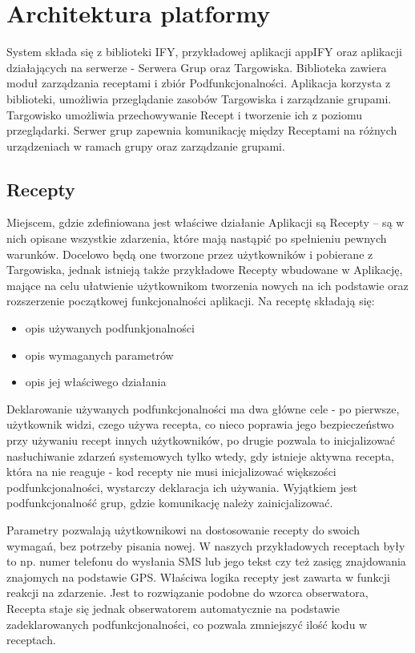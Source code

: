 \documentclass[11pt,a4paper,polish,thesis]{dcsbook}
\begin{document}
\chapter{Architektura platformy}
System składa się z biblioteki IFY, przykładowej aplikacji appIFY oraz aplikacji działających na serwerze - Serwera Grup oraz Targowiska.
Biblioteka zawiera moduł zarządzania receptami i zbiór Podfunkcjonalności.
Aplikacja korzysta z biblioteki, umożliwia przeglądanie zasobów Targowiska i zarządzanie grupami. 
Targowisko umożliwia przechowywanie Recept i tworzenie ich z poziomu przeglądarki.
Serwer grup zapewnia komunikację między Receptami na różnych urządzeniach w ramach grupy oraz zarządzanie grupami.

\section{Recepty}
Miejscem, gdzie zdefiniowana jest właściwe działanie Aplikacji są Recepty -- są w nich opisane wszystkie zdarzenia, które mają nastąpić po spełnieniu pewnych warunków. Docelowo będą one tworzone przez użytkowników i pobierane z Targowiska, jednak istnieją także przykładowe Recepty wbudowane w Aplikację, mające na celu ułatwienie użytkownikom tworzenia nowych na ich podstawie oraz rozszerzenie początkowej funkcjonalności aplikacji. 
Na receptę składają się:
\begin{itemize}
\item  opis używanych podfunkjonalności
\item  opis wymaganych parametrów
\item  opis jej właściwego działania
\end{itemize}
Deklarowanie używanych podfunkcjonalności ma dwa główne cele - po pierwsze, użytkownik widzi, czego używa recepta, co nieco poprawia jego bezpieczeństwo przy używaniu recept innych użytkowników, po drugie pozwala to inicjalizować nasłuchiwanie zdarzeń systemowych tylko wtedy, gdy istnieje aktywna recepta, która na nie reaguje - kod recepty nie musi inicjalizować większości podfunkcjonalności, wystarczy deklaracja ich używania. Wyjątkiem jest podfunkcjonalność grup, gdzie komunikację należy zainicjalizować.

Parametry pozwalają użytkownikowi na dostosowanie recepty do swoich wymagań, bez potrzeby pisania nowej. W naszych przykładowych receptach były to np. numer telefonu do wysłania SMS lub jego tekst czy też zasięg znajdowania znajomych na podstawie GPS.
Właściwa logika recepty jest zawarta w funkcji reakcji na zdarzenie. Jest to rozwiązanie podobne do wzorca obserwatora, Recepta staje się jednak obserwatorem automatycznie na podstawie zadeklarowanych podfunkcjonalności, co pozwala zmniejszyć ilość kodu w receptach.
\end{document}
